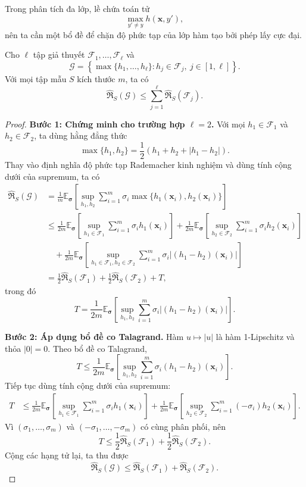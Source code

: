 Trong phân tích đa lớp, lề chứa toán tử
\[
  \max_{y'\neq y}h(\bm{x},y'),
\]
nên ta cần một bổ đề để chặn độ phức tạp của lớp hàm tạo bởi phép lấy cực đại.

\begin{proposition}
Cho $\ell$ tập giả thuyết $\mathcal{F}_1,\ldots,\mathcal{F}_\ell$ và
\[
  \mathcal{G}=\left\{\max\{h_1,\ldots,h_\ell\}:h_j\in\mathcal{F}_j,
  \ j\in[1,\ell]\right\}.
\]
Với mọi tập mẫu $S$ kích thước $m$, ta có
\[
  \widehat{\mathfrak{R}}_S(\mathcal{G})
  \leq \sum_{j=1}^{\ell}\widehat{\mathfrak{R}}_S(\mathcal{F}_j).
\]
\end{proposition}

\begin{proof}  
\textbf{Bước 1: Chứng minh cho trường hợp $\ell=2$.}
Với mọi $h_1\in\mathcal{F}_1$ và $h_2\in\mathcal{F}_2$, ta dùng hằng đẳng thức
\[
  \max\{h_1,h_2\}=\frac{1}{2}\left(h_1+h_2+|h_1-h_2|\right).
\]
Thay vào định nghĩa độ phức tạp Rademacher kinh nghiệm và dùng tính cộng dưới của supremum, ta có
\begin{align*}
  \widehat{\mathfrak{R}}_S(\mathcal{G})
  &=\frac{1}{m}\mathbb{E}_{\bm{\sigma}}
  \left[\sup_{h_1,h_2}\sum_{i=1}^{m}\sigma_i
  \max\{h_1(\bm{x}_i),h_2(\bm{x}_i)\}\right]\\
  &\leq \frac{1}{2m}\mathbb{E}_{\bm{\sigma}}
  \left[\sup_{h_1\in\mathcal{F}_1}\sum_{i=1}^{m}\sigma_i h_1(\bm{x}_i)\right]
  +\frac{1}{2m}\mathbb{E}_{\bm{\sigma}}
  \left[\sup_{h_2\in\mathcal{F}_2}\sum_{i=1}^{m}\sigma_i h_2(\bm{x}_i)\right]\\
  &\quad +\frac{1}{2m}\mathbb{E}_{\bm{\sigma}}
  \left[\sup_{h_1\in\mathcal{F}_1,h_2\in\mathcal{F}_2}
  \sum_{i=1}^{m}\sigma_i |(h_1-h_2)(\bm{x}_i)|\right]\\
  &=\frac{1}{2}\widehat{\mathfrak{R}}_S(\mathcal{F}_1)
  +\frac{1}{2}\widehat{\mathfrak{R}}_S(\mathcal{F}_2)+T,
\end{align*}
trong đó
\[
  T=\frac{1}{2m}\mathbb{E}_{\bm{\sigma}}
  \left[\sup_{h_1,h_2}
  \sum_{i=1}^{m}\sigma_i |(h_1-h_2)(\bm{x}_i)|\right].
\]

\textbf{Bước 2: Áp dụng bổ đề co Talagrand.}
Hàm $u\mapsto |u|$ là hàm 1-Lipschitz và thỏa $|0|=0$. Theo bổ đề co Talagrand,
\[
  T\leq \frac{1}{2m}\mathbb{E}_{\bm{\sigma}}
  \left[\sup_{h_1,h_2}\sum_{i=1}^{m}\sigma_i(h_1-h_2)(\bm{x}_i)\right].
\]
Tiếp tục dùng tính cộng dưới của supremum:
\begin{align*}
  T
  &\leq \frac{1}{2m}\mathbb{E}_{\bm{\sigma}}
  \left[\sup_{h_1\in\mathcal{F}_1}\sum_{i=1}^{m}\sigma_i h_1(\bm{x}_i)\right]
  +\frac{1}{2m}\mathbb{E}_{\bm{\sigma}}
  \left[\sup_{h_2\in\mathcal{F}_2}\sum_{i=1}^{m}(-\sigma_i)h_2(\bm{x}_i)\right].
\end{align*}
Vì $(\sigma_1,\ldots,\sigma_m)$ và $(-\sigma_1,\ldots,-\sigma_m)$ có cùng phân phối, nên
\[
  T\leq \frac{1}{2}\widehat{\mathfrak{R}}_S(\mathcal{F}_1)
  +\frac{1}{2}\widehat{\mathfrak{R}}_S(\mathcal{F}_2).
\]
Cộng các hạng tử lại, ta thu được
\[
  \widehat{\mathfrak{R}}_S(\mathcal{G})
  \leq \widehat{\mathfrak{R}}_S(\mathcal{F}_1)
  +\widehat{\mathfrak{R}}_S(\mathcal{F}_2).
\]


\end{proof}
